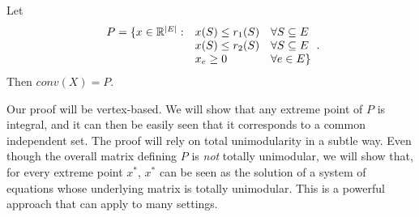 \documentclass[12pt]{article}
\begin{document}
\begin{theorem} \label{matintpol}
Let $$\begin{array}{rll} 
P = \{x\in {\mathbb R}^{|E|}: & x(S) \leq r_1(S) & \forall S\subseteq E \\
& x(S) \leq r_2(S) & \forall S\subseteq E \\
& x_e \geq 0 & \forall e\in E\}
\end{array}.$$
Then $conv(X)=P$. 
\end{theorem}

Our proof will be vertex-based. We will show that any extreme point of
$P$ is integral, and it can then be easily seen that it corresponds to
a common independent set. The proof will rely on total unimodularity
in a subtle way. Even though the overall matrix defining $P$ is {\it
not} totally unimodular, we will show that, for every extreme point
$x^*$, $x^*$ can be seen as the solution of a system of equations
whose underlying matrix is totally unimodular. This is a powerful
approach that can apply to many settings.  
\end{document}
